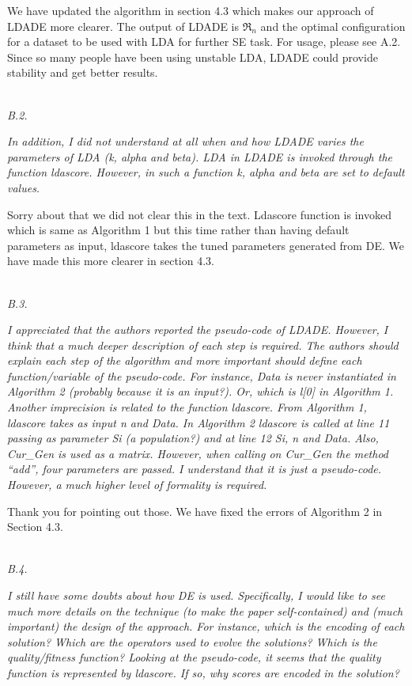 \documentclass[conference]{IEEEtran}
\begin{document}
We have updated the algorithm in section 4.3 which makes our approach of LDADE more clearer. The output of LDADE is $\Re_n$ and the optimal configuration for a dataset to be used with LDA for further SE task. For usage, please see A.2. Since so many people have been using unstable LDA, LDADE could provide stability and get better results.

\noindent
\textit{\\B.2.}  

\textit{In addition, I did not understand at all when and how LDADE varies the parameters of LDA (k, alpha and beta). LDA in LDADE is invoked through the function ldascore. However, in such a function k, alpha and beta are set to default values.\\}

Sorry about that we did not clear this in the text. Ldascore function is invoked which is same as Algorithm 1 but this time rather than having default parameters as input, ldascore takes the tuned parameters generated from DE. We have made this more clearer in section 4.3.

\noindent
\textit{\\B.3.} 

\textit{I appreciated that the authors reported the pseudo-code of LDADE. However, I think that a much deeper description of each step is required. The authors should explain each step of the algorithm and more important should define each function/variable of the pseudo-code. For instance, Data is never instantiated in Algorithm 2 (probably because it is an input?). Or, which is l[0] in Algorithm 1. Another imprecision is related to the function ldascore. From Algorithm 1, ldascore takes as input n and Data. In Algorithm 2 ldascore is called at line 11 passing as parameter Si (a population?) and at line 12 Si, n and Data. Also, Cur\_Gen is used as a matrix. However, when calling on Cur\_Gen the method ``add'', four parameters are passed. I understand that it is just a pseudo-code. However, a much higher level of formality is required.\\}

Thank you for pointing out those. We have fixed the errors of Algorithm 2 in Section 4.3. 

\noindent
\textit{\\B.4.} 

\textit{I still have some doubts about how DE is used. Specifically, I would like to see much more details on the technique (to make the paper self-contained) and (much important) the design of the approach. For instance, which is the encoding of each solution? Which are the operators used to evolve the solutions? Which is the quality/fitness function? Looking at the pseudo-code, it seems that the quality function is represented by ldascore. If so, why scores are encoded in the solution?\\} 
\end{document}
